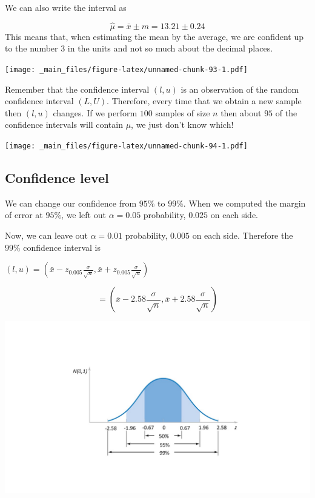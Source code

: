 \documentclass[
]{book}
\begin{document}
We can also write the interval as

\[\hat{\mu}=\bar{x}  \pm m = 13.21 \pm 0.24\]
This means that, when estimating the mean by the average, we are confident up to the number 3 in the units and not so much about the decimal places.

\texttt{[image: \_main\_files/figure-latex/unnamed-chunk-93-1.pdf]}

Remember that the confidence interval \((l,u)\) is an observation of the random confidence interval \((L,U)\). Therefore, every time that we obtain a new sample then \((l,u)\) changes. If we perform \(100\) samples of size \(n\) then about \(95\) of the confidence intervals will contain \(\mu\), we just don't know which!

\texttt{[image: \_main\_files/figure-latex/unnamed-chunk-94-1.pdf]}

\hypertarget{confidence-level}{%
\subsection{Confidence level}\label{confidence-level}}

We can change our confidence from \(95\%\) to \(99\%\). When we computed the margin of error at \(95\%\), we left out \(\alpha=0.05\) probability, \(0.025\) on each side.

Now, we can leave out \(\alpha=0.01\) probability, \(0.005\) on each side. Therefore the \(99\%\) confidence interval is

\((l,u) = (\bar{x} - z_{0.005}\frac{\sigma}{\sqrt{n}},\bar{x} + z_{0.005}\frac{\sigma}{\sqrt{n}})\)

\[= (\bar{x} - 2.58\frac{\sigma}{\sqrt{n}},\bar{x} + 2.58\frac{\sigma}{\sqrt{n}})\]

\includegraphics{./figures/phi.JPG}
\end{document}
